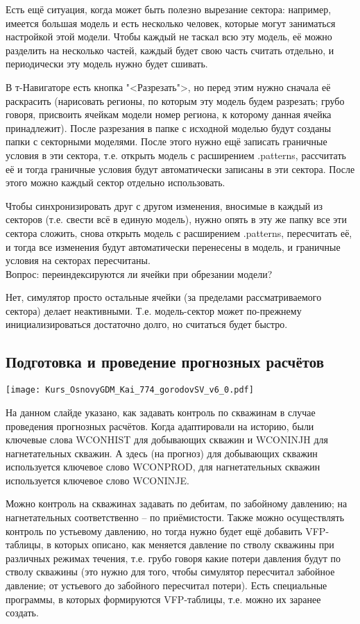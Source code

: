 \documentclass[main.tex]{subfiles}
\begin{document}
Есть ещё ситуация, когда может быть полезно вырезание сектора: например, имеется большая модель и есть несколько человек, которые могут заниматься настройкой этой модели.
Чтобы каждый не таскал всю эту модель, её можно разделить на несколько частей, каждый будет свою часть считать отдельно, и периодически эту модель нужно будет сшивать.

В т-Навигаторе есть кнопка "<Разрезать">, но перед этим нужно сначала её раскрасить (нарисовать регионы, по которым эту модель будем разрезать; грубо говоря, присвоить ячейкам модели номер региона, к которому данная ячейка принадлежит).
После разрезания в папке с исходной моделью будут созданы папки с секторными моделями.
После этого нужно ещё записать граничные условия в эти сектора, т.е. открыть модель с расширением .patterns, рассчитать её и тогда граничные условия будут автоматически записаны в эти сектора.
После этого можно каждый сектор отдельно использовать.

Чтобы синхронизировать друг с другом изменения, вносимые в каждый из секторов (т.е. свести всё в единую модель), нужно опять в эту же папку все эти сектора сложить, снова открыть модель с расширением .patterns, пересчитать её, и тогда все изменения будут автоматически перенесены в модель, и граничные условия на секторах пересчитаны.
\\

Вопрос: переиндексируются ли ячейки при обрезании модели?

Нет, симулятор просто остальные ячейки (за пределами рассматриваемого сектора) делает неактивными.
Т.е. модель-сектор может по-прежнему инициализироваться достаточно долго, но считаться будет быстро.

\subsection{Подготовка и проведение прогнозных расчётов}

\texttt{[image: Kurs\_OsnovyGDM\_Kai\_774\_gorodovSV\_v6\_0.pdf]}

На данном слайде указано, как задавать контроль по скважинам в случае проведения прогнозных расчётов.
Когда адаптировали на историю, были ключевые слова WCONHIST для добывающих скважин и WCONINJH для нагнетательных скважин.
А здесь (на прогноз) для добывающих скважин используется ключевое слово WCONPROD, для нагнетательных скважин используется ключевое слово WCONINJE.

Можно контроль на скважинах задавать по дебитам, по забойному давлению; на нагнетательных соответственно -- по приёмистости.
Также можно осуществлять контроль по устьевому давлению, но тогда нужно будет ещё добавить VFP-таблицы, в которых описано, как меняется давление по стволу скважины при различных режимах течения, т.е. грубо говоря какие потери давления будут по стволу скважины (это нужно для того, чтобы симулятор пересчитал забойное давление; от устьевого до забойного пересчитал потери).
Есть специальные программы, в которых формируются VFP-таблицы, т.е. можно их заранее создать.
\\
\end{document}
